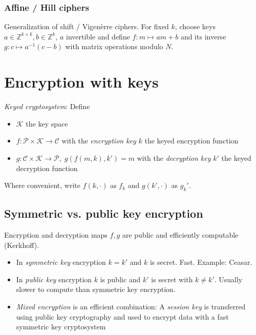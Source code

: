 \documentclass[a4paper]{scrartcl}
\newcommand\Z{\mathbb Z}
\newcommand\cP{\mathcal P}
\newcommand\cC{\mathcal C}
\newcommand\cK{\mathcal K}
\begin{document}
\subsubsection{Affine / Hill ciphers}

Generalization of shift / Vigen\`erre ciphers. For fixed $k$, choose keys $a\in\Z^{k\times k},
b\in\Z^k$, $a$ invertible and define $f: m\mapsto am+b$ and its inverse $g: c\mapsto a^{-1}(c-b)$
with matrix operations modulo $N$. 

\newpage
\section{Encryption with keys}

\textit{Keyed cryptosystem}: Define\begin{itemize}
    \item $\cK$ the key space
    \item $f: \cP\times\cK\rightarrow\cC$ with the
        \textit{encryption key} $k$ the keyed encryption function 
    \item $g: \cC\times\cK\rightarrow\cP,\;g(f(m,k),k')=m$ with the
        \textit{decryption key} $k'$ the keyed decryption function 
\end{itemize}

Where convenient, write $f(k, \cdot)$ as $f_k$ and $g(k',\cdot)$ as $g_k'$.

\subsection{Symmetric vs. public key encryption}

Encryption and decryption maps $f, g$ are public and efficiently computable (Kerkhoff).

\begin{itemize}
    \item In \textit{symmetric key} encryption $k=k'$ and $k$ is secret. Fast. Example: Ceasar.

    \item In \textit{public key} encryption $k$ is public and $k'$ is secret with $k\neq k'$.
        Usually slower to compute than symmetric key encryption.

    \item \textit{Mixed encryption} is an efficient combination: A \textit{session key} is
        transferred using public key cryptography and used to encrypt data with a fast symmetric
        key cryptosystem
\end{itemize}
\end{document}
